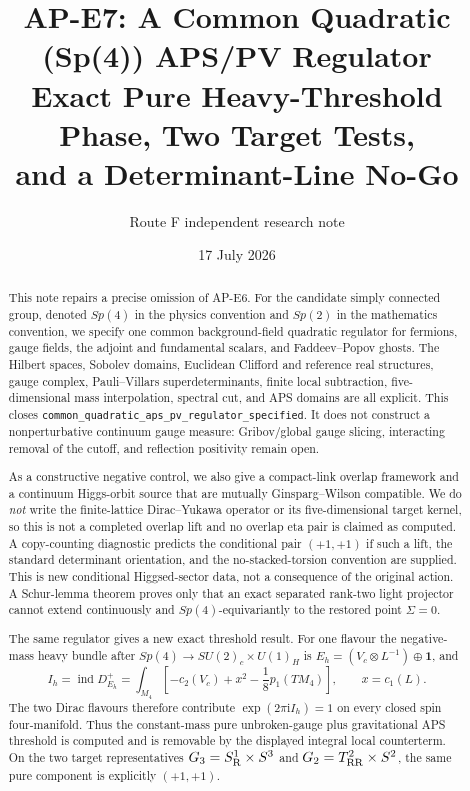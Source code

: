 \documentclass[11pt]{article}
\title{AP-E7: A Common Quadratic (Sp(4)) APS/PV Regulator\\
Exact Pure Heavy-Threshold Phase, Two Target Tests,\\
and a Determinant-Line No-Go}
\author{Route F independent research note}
\date{17 July 2026}
\theoremstyle{definition}
\theoremstyle{remark}
\newcommand{\ii}{\mathrm i}
\newcommand{\ind}{\operatorname{ind}}
\begin{document}
\maketitle

\begin{abstract}
This note repairs a precise omission of AP-E6.  For the candidate simply
connected group, denoted \(Sp(4)\) in the physics convention and
\(Sp(2)\) in the mathematics convention, we specify one common
background-field quadratic regulator for fermions, gauge fields,
    the adjoint and fundamental scalars, and Faddeev--Popov ghosts.  The
    Hilbert spaces, Sobolev domains, Euclidean Clifford and reference real structures,
gauge complex, Pauli--Villars superdeterminants, finite local subtraction,
five-dimensional mass interpolation, spectral cut, and APS domains are all
explicit.  This closes
\texttt{common\_quadratic\_aps\_pv\_regulator\_specified}.  It does not
construct a nonperturbative continuum gauge measure: Gribov/global gauge
slicing, interacting removal of the cutoff, and reflection positivity remain
open.

As a constructive negative control, we also give a compact-link overlap
framework and a continuum Higgs-orbit source that are mutually
Ginsparg--Wilson compatible.  We do \emph{not} write the finite-lattice
Dirac--Yukawa operator or its five-dimensional target kernel, so this is not a
completed overlap lift and no overlap eta pair is claimed as computed.  A
copy-counting diagnostic predicts the conditional pair \((+1,+1)\) if such a
lift, the standard determinant orientation, and the no-stacked-torsion
convention are supplied.  This is new conditional Higgsed-sector data, not a
consequence of the original action.  A Schur-lemma theorem proves only that
an exact separated rank-two light projector cannot extend continuously and
\(Sp(4)\)-equivariantly to the restored point \(\Sigma=0\).

The same regulator gives a new exact threshold result.  For one flavour the
negative-mass heavy bundle after
\(Sp(4)\to SU(2)_c\times U(1)_H\) is
\(E_h=(V_c\otimes L^{-1})\oplus\bm1\), and
\[
 I_h=\ind D^+_{E_h}
 =\int_{M_4}\left[-c_2(V_c)+x^2-\frac18p_1(TM_4)\right],
 \qquad x=c_1(L).
\]
The two Dirac flavours therefore contribute
\(\exp(2\pi\ii I_h)=1\) on every closed spin four-manifold.  Thus the
constant-mass pure unbroken-gauge plus gravitational APS threshold is
computed and is removable by the displayed integral local counterterm.  On
the two target representatives
\(G_3=S^1_{\rm R}\times S^3\) and
\(G_2=T^2_{\rm RR}\times S^2\), the same pure component is explicitly
\((+1,+1)\).


\end{abstract}
\end{document}
